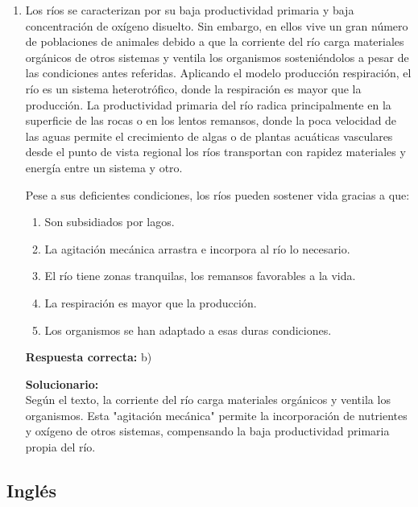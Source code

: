 \begin{enumerate}
	\item Los ríos se caracterizan por su baja productividad primaria y baja concentración de oxígeno disuelto. Sin embargo, en ellos vive un gran número de poblaciones de animales debido a que la corriente del río carga materiales orgánicos de otros sistemas y ventila los organismos sosteniéndolos a pesar de las condiciones antes referidas. Aplicando el modelo producción  respiración, el río es un sistema heterotrófico, donde la respiración es mayor que la producción. La productividad primaria del río radica principalmente en la superficie de las rocas o en los lentos remansos, donde la poca velocidad de las aguas permite el crecimiento de algas o de plantas acuáticas vasculares desde el punto de vista regional los ríos transportan con rapidez materiales y energía entre un sistema y otro.
	
	Pese a sus deficientes condiciones, los ríos pueden sostener vida gracias a que:
	
	\begin{enumerate}[label=\alph*)]
		\item Son subsidiados por lagos.
		\item La agitación mecánica arrastra e incorpora al río lo necesario.
		\item El río tiene zonas tranquilas, los remansos favorables a la vida.
		\item La respiración es mayor que la producción.
		\item Los organismos se han adaptado a esas duras condiciones.
	\end{enumerate}
	
	\textbf{Respuesta correcta:} b)
	
	\vspace{2mm}
	\textbf{Solucionario:}\\
	Según el texto, la corriente del río carga materiales orgánicos y ventila los organismos. Esta "agitación mecánica" permite la incorporación de nutrientes y oxígeno de otros sistemas, compensando la baja productividad primaria propia del río.
	
	\vspace{6mm}
	
\end{enumerate}


\subsection*{Inglés}

